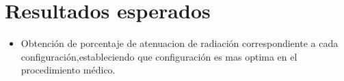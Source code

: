 \documentclass[a4paper,10pt]{article}
\begin{document}
\section{Resultados esperados}
\begin{itemize}
 \item Obtención de porcentaje de atenuacion de radiación correspondiente a cada configuración,estableciendo que configuración es mas optima en el procedimiento médico.
 
 \end{itemize}
\end{document}
